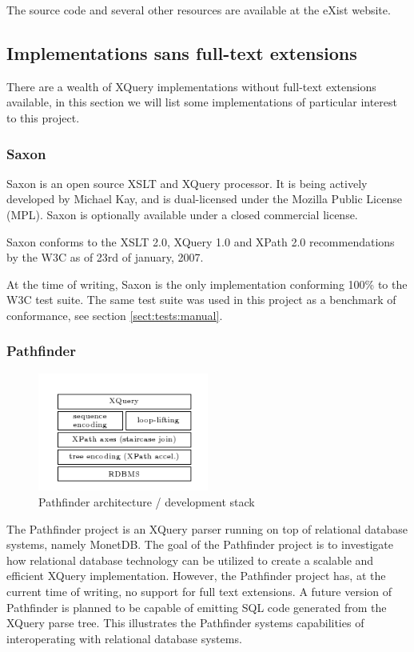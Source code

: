 The source code and several other resources are available at the eXist
website\cite{existweb}. 

\subsection{Implementations sans full-text extensions}
There are a wealth of XQuery implementations without full-text
extensions available, in this section we will list some implementations of
particular interest to this project.
\subsubsection{Saxon}
Saxon is an open source XSLT and XQuery processor. It is being actively
developed by Michael Kay, and is dual-licensed under the Mozilla Public License
(MPL). Saxon is optionally available under a closed commercial license.

Saxon conforms to the XSLT 2.0, XQuery 1.0 and XPath 2.0 recommendations
by the W3C as of 23rd of january, 2007. 

At the time of writing, Saxon is the only implementation conforming 100\% to
the W3C test suite\cite{w3ctestresults}. The same test suite was used in this
project as a benchmark of conformance, see section \ref{sect:tests:manual}.

\subsubsection{Pathfinder}
\label{sect:soa:pathfinder}
\begin{figure}[!h]
  \centering
    \includegraphics[width=0.5\textwidth]{img/pathfinder_architecture.png}
  \caption{Pathfinder architecture / development stack}
\end{figure}

The Pathfinder project is an XQuery parser running on top of relational
database systems, namely MonetDB. The goal of the Pathfinder project is to
investigate how relational database technology can be utilized to create a
scalable and efficient XQuery implementation. However, the Pathfinder project
has, at the current time of writing, no support for full text extensions. A
future version of Pathfinder is planned to be capable of emitting SQL code
generated from the XQuery parse tree. This illustrates the Pathfinder systems
capabilities of interoperating with relational database systems.

